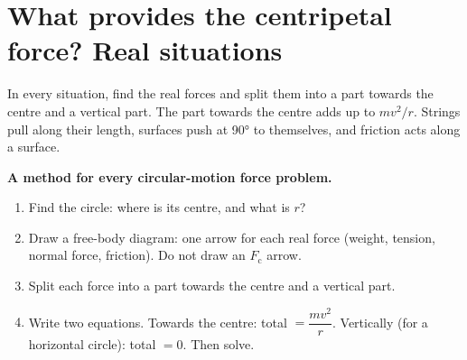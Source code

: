 \section{What provides the centripetal force? Real situations}\label{ch2:sec:situations}

\begin{bigidea}
In every situation, find the real forces and split them into a part towards the centre
and a vertical part. The part towards the centre adds up to $mv^2/r$. Strings pull along
their length, surfaces push at \ang{90} to themselves, and friction acts along a surface.
\end{bigidea}

\begin{keywords}
\end{keywords}

\textbf{A method for every circular-motion force problem.}
\begin{enumerate}
  \item Find the circle: where is its centre, and what is $r$?
  \item Draw a free-body diagram: one arrow for each real force (weight, tension, normal
        force, friction). Do not draw an $F_\mathrm{c}$ arrow.
  \item Split each force into a part towards the centre and a vertical part.
  \item Write two equations. Towards the centre: total $= \dfrac{mv^2}{r}$. Vertically (for a
        horizontal circle): total $= 0$. Then solve.
\end{enumerate}

